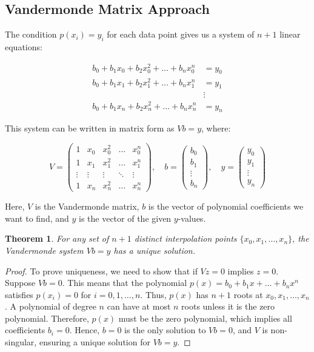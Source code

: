 \documentclass{article}
\newtheorem{theorem}{Theorem}
\begin{document}
\subsection{Vandermonde Matrix Approach}

The condition $p(x_i) = y_i$ for each data point gives us a system of $n+1$ linear equations:

\begin{align*}
b_0 + b_1 x_0 + b_2 x_0^2 + \dots + b_n x_0^n &= y_0 \\
b_0 + b_1 x_1 + b_2 x_1^2 + \dots + b_n x_1^n &= y_1 \\
& \vdots \\
b_0 + b_1 x_n + b_2 x_n^2 + \dots + b_n x_n^n &= y_n
\end{align*}

This system can be written in matrix form as $Vb = y$, where:

\[ V = \begin{pmatrix}
1 & x_0 & x_0^2 & \dots & x_0^n \\
1 & x_1 & x_1^2 & \dots & x_1^n \\
\vdots & \vdots & \vdots & \ddots & \vdots \\
1 & x_n & x_n^2 & \dots & x_n^n
\end{pmatrix}, \quad
b = \begin{pmatrix}
b_0 \\ b_1 \\ \vdots \\ b_n
\end{pmatrix}, \quad
y = \begin{pmatrix}
y_0 \\ y_1 \\ \vdots \\ y_n
\end{pmatrix} \]

Here, $V$ is the Vandermonde matrix, $b$ is the vector of polynomial coefficients we want to find, and $y$ is the vector of the given $y$-values.

\begin{theorem}
For any set of $n+1$ distinct interpolation points $\{x_0, x_1, \dots, x_n\}$, the Vandermonde system $Vb = y$ has a unique solution.
\end{theorem}
\begin{proof}
To prove uniqueness, we need to show that if $Vz = 0$ implies $z = 0$. Suppose $Vb = 0$. This means that the polynomial $p(x) = b_0 + b_1 x + \dots + b_n x^n$ satisfies $p(x_i) = 0$ for $i = 0, 1, \dots, n$. Thus, $p(x)$ has $n+1$ roots at $x_0, x_1, \dots, x_n$. A polynomial of degree $n$ can have at most $n$ roots unless it is the zero polynomial. Therefore, $p(x)$ must be the zero polynomial, which implies all coefficients $b_i = 0$. Hence, $b=0$ is the only solution to $Vb=0$, and $V$ is non-singular, ensuring a unique solution for $Vb=y$.
\end{proof}
\end{document}
